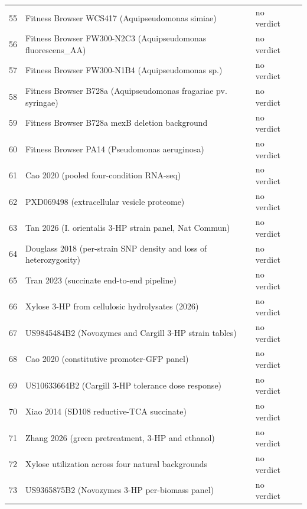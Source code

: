 \begin{longtable}{@{}r L{76mm} L{20mm} L{36mm} L{24mm}@{}}
55 & Fitness Browser WCS417 (Aquipseudomonas simiae) &  & no verdict &  \\
56 & Fitness Browser FW300-N2C3 (Aquipseudomonas fluorescens\_AA) &  & no verdict &  \\
57 & Fitness Browser FW300-N1B4 (Aquipseudomonas sp.) &  & no verdict &  \\
58 & Fitness Browser B728a (Aquipseudomonas fragariae pv. syringae) &  & no verdict &  \\
59 & Fitness Browser B728a mexB deletion background &  & no verdict &  \\
60 & Fitness Browser PA14 (Pseudomonas aeruginosa) &  & no verdict &  \\
61 & Cao 2020 (pooled four-condition RNA-seq) &  & no verdict &  \\
62 & PXD069498 (extracellular vesicle proteome) &  & no verdict &  \\
63 & Tan 2026 (I. orientalis 3-HP strain panel, Nat Commun) &  & no verdict &  \\
64 & Douglass 2018 (per-strain SNP density and loss of heterozygosity) &  & no verdict &  \\
65 & Tran 2023 (succinate end-to-end pipeline) &  & no verdict &  \\
66 & Xylose 3-HP from cellulosic hydrolysates (2026) &  & no verdict &  \\
67 & US9845484B2 (Novozymes and Cargill 3-HP strain tables) &  & no verdict &  \\
68 & Cao 2020 (constitutive promoter-GFP panel) &  & no verdict &  \\
69 & US10633664B2 (Cargill 3-HP tolerance dose response) &  & no verdict &  \\
70 & Xiao 2014 (SD108 reductive-TCA succinate) &  & no verdict &  \\
71 & Zhang 2026 (green pretreatment, 3-HP and ethanol) &  & no verdict &  \\
72 & Xylose utilization across four natural backgrounds &  & no verdict &  \\
73 & US9365875B2 (Novozymes 3-HP per-biomass panel) &  & no verdict &  \\

\end{longtable}
